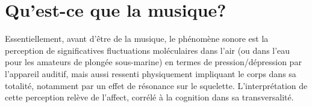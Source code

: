 \documentclass{article}
\begin{document}



%
%

%    
  

\section{Qu’est-ce que la musique?}

Essentiellement, avant d'être de la musique, le phénomène sonore est la perception de significatives fluctuations moléculaires dans l'air (ou dans l'eau pour les amateurs de plongée sous-marine) en termes de pression/dépression par l'appareil auditif, mais aussi ressenti physiquement impliquant le corps dans sa totalité, notamment par un effet de résonance sur le squelette. L'interprétation de cette perception relève de l'affect, corrélé à la cognition dans sa transversalité.
\end{document}
